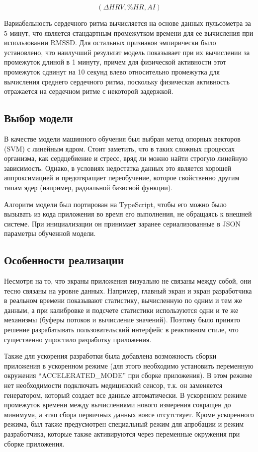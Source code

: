 \documentclass[14pt]{matmex-diploma-custom}
\begin{document}
\begin{equation} \label{eq:feature_vector}
  ({\Delta}HRV, \%HR, AI)
\end{equation}

Вариабельность сердечного ритма вычисляется на основе данных пульсометра за 5
минут, что является стандартным промежутком времени для ее вычисления при
использовании RMSSD. Для остальных признаков эмпирически было установлено, что
наилучший результат модель показывает при их вычислении за промежуток длиной в 1
минуту, причем для физической активности этот промежуток сдвинут на 10 секунд
влево относительно промежутка для вычисления среднего сердечного ритма,
поскольку физическая активность отражается на сердечном ритме с некоторой
задержкой.

\subsection{Выбор модели}
В качестве модели машинного обучения был выбран метод опорных векторов (SVM) с
линейным ядром. Стоит заметить, что в таких сложных процессах организма, как
сердцебиение и стресс, вряд ли можно найти строгую линейную зависимость. Однако,
в условиях недостатка данных это является хорошей аппроксимацией и предотвращает
переобучение, которое свойственно другим типам ядер (например, радиальной
базисной функции).

Алгоритм модели был портирован на TypeScript, чтобы его можно было вызывать из
кода приложения во время его выполнения, не обращаясь к внешней системе. При
инициализации он принимает заранее сериализованные в JSON параметры обученной
модели.

\subsection{Особенности реализации}
Несмотря на то, что экраны приложения визуально не связаны между собой, они
тесно связаны на уровне данных. Например, главный экран и экран разработчика в
реальном времени показывают статистику, вычисленную по одним и тем же данным, а
при калибровке и подсчете статистики используются одни и те же механизмы (буферы
потоков и вычисление значений). Поэтому было принято решение разрабатывать
пользовательский интерфейс в реактивном стиле, что существенно упростило
разработку приложения.

Также для ускорения разработки была добавлена возможность сборки приложения в
ускоренном режиме (для этого необходимо установить переменную окружения
``ACCELERATED\_MODE'' при сборке приложения). В этом режиме нет необходимости
подключать медицинский сенсор, т.к. он заменяется генератором, который создает
все данные автоматически. В ускоренном режиме промежуток времени между
вычислениями нового измерения сокращен до минимума, а этап сбора первичных
данных вовсе отсутствует. Кроме ускоренного режима, был также предусмотрен
специальный режим для апробации и режим разработчика, которые также активируются
через переменные окружения при сборке приложения.
\end{document}
